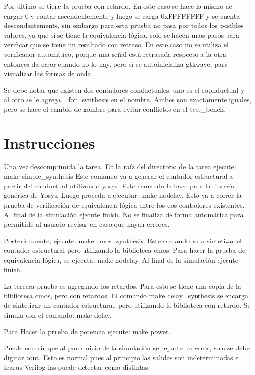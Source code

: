 \documentclass {article}
\begin{document}
Por último se tiene la prueba con retardo. En este caso se hace lo
mismo de cargar 0 y contar ascendentemente y luego se carga 0xFFFFFFFF
y se cuenta descendentemente, sin embargo para esta prueba no pasa por
todos los posibles valores, ya que sí se tiene la equivalencia lógica,
solo se hacen unos pasos para verificar que se tiene un resultado con
retraso. En este caso no se utiliza el verificador automático, porque
una señal está retrasada respecto a la otra, entonces da error cuando
no lo hay, pero sí se autoinicializa gtkwave, para visualizar las
formas de onda.

Se debe notar que existen dos contadores conductuales, uno es el
copnductual y al otro se le agrega \_for\_synthesis en el
nombre. Ambos son exactamente iguales, pero se hace el cambio de
nombre para evitar conflictos en el test\_bench. 

\section{Instrucciones}

Una vez descomprimida la tarea. En la raíz del directorio de la tarea
ejecute: make simple\_synthesis Este comando va a generar el contador
estructural a partir del conductual utilizando yosys.  Este comando lo
hace para la librería genérica de Yosys. Luego proceda a ejecutar:
make nodelay.  Esto va a correr la prueba de verificación de
equivalencia lógica entre los dos contadores existentes.  Al final de
la simulación ejecute finish. No se finaliza de forma automática para 
permitirle al usuario revisar en caso que hayan errores. 

Posteriormente, ejecute: make cmos\_synthesis. Este comando va a
sintetizar el contador estructural pero utilizando la biblioteca
cmos. Para hacer la prueba de equivalencia lógica, se ejecuta: make
nodelay.  Al final de la simulación ejecute finish. 

La tercera prueba es agregando los retardos. Para esto se tiene una
copia de la biblioteca cmos, pero con retardos. El comando make
delay\_synthesis se encarga de sintetizar un contador estructural,
pero utilizando la biblioteca con retardo. Se simula con el comando:
make delay.

Para Hacer la prueba de potencia ejecute: make power.

Puede ocurrir que al puro inicio de la simulación se reporte un error, solo se debe digitar cont. Esto es normal pues al principio las salidas son indeterminadas e Icarus Verilog las puede detectar como distintas. 
\end{document}
